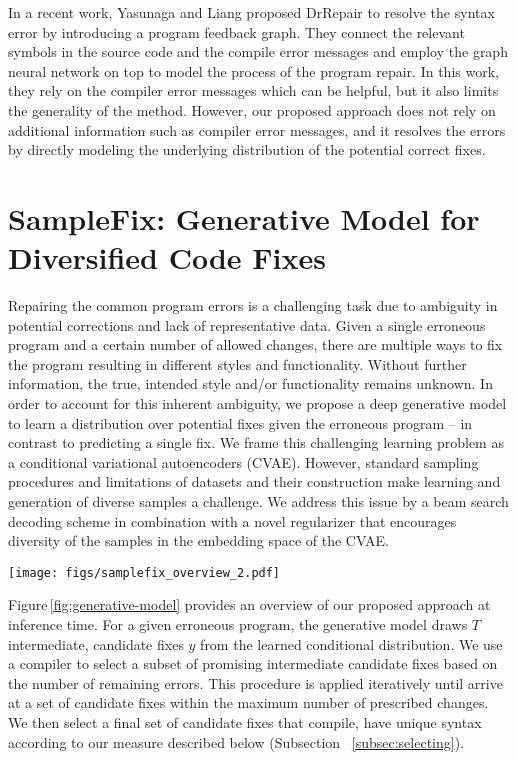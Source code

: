 \documentclass[runningheads]{llncs}
\newcommand{\figref}{Figure}
\begin{document}
In a recent work, Yasunaga and Liang \cite{yasunaga2020repair} proposed DrRepair to resolve the syntax error by introducing a program feedback graph. They connect the relevant symbols in the source code and the compile error messages and employ the graph neural network on top to model the process of the program repair. In this work, they rely on the compiler error messages which can be helpful, but it also limits the generality of the method. However, our proposed approach does not rely on additional information such as compiler error messages, and it resolves the errors by directly modeling the underlying distribution of the potential correct fixes. 


\section{SampleFix: Generative Model for Diversified Code Fixes} 
Repairing the common program errors is a challenging task due to ambiguity in potential corrections and lack of representative data. Given a single erroneous program and a certain number of allowed changes, there are multiple ways to fix the program resulting in different styles and functionality. Without further information, the true, intended style and/or functionality remains unknown. In order to account for this inherent ambiguity, we propose a deep generative model to learn a distribution over potential fixes given the erroneous program -- in contrast to predicting a single fix. We frame this challenging learning problem as a conditional variational autoencoders (CVAE).
However, standard sampling procedures and limitations of datasets and their construction make learning and generation of diverse samples a challenge. We address this issue by a beam search decoding scheme in combination with a novel regularizer that encourages diversity of the samples in the embedding space of the CVAE.

\begin{figure*}[h] 
	\centering
	    \centering
		\texttt{[image: figs/samplefix\_overview\_2.pdf]}
	
	\caption{Overview of SampleFix at inference time, highlighting the generation of diverse fixes.}
	\label{fig:generative-model}
\end{figure*}
\figref \,\ref{fig:generative-model} provides an overview of our proposed approach at inference time. 
For a given erroneous program, the generative model draws $T$ intermediate, candidate fixes $\hat{y}$ from the learned conditional distribution. We use a compiler to select a subset of promising intermediate candidate fixes based on the number of remaining errors. This procedure is applied iteratively until arrive at a set of candidate fixes within the maximum number of prescribed changes. We then select a final set of candidate fixes that compile, have unique syntax according to our measure described below (Subsection ~\ref{subsec:selecting}).
\end{document}
